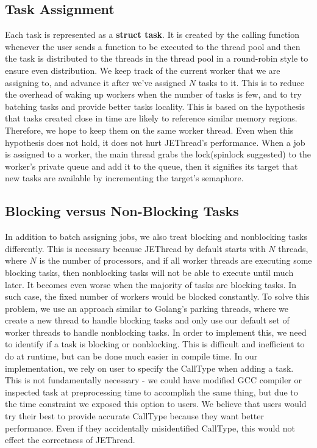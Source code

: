 \documentclass[journal, a4paper]{IEEEtran}
\begin{document}
\subsection{Task Assignment}
Each task is represented as a \textbf{struct task}. It is created by the calling function whenever the user sends a function to be executed to the thread pool and then the task is distributed to the threads in the thread pool in a round-robin style to ensure even distribution. We keep track of the current worker that we are assigning to, and advance it after we've assigned $N$ tasks to it. This is to reduce the overhead of waking up workers when the number of tasks is few, and to try batching tasks and provide better tasks locality. This is based on the hypothesis that tasks created close in time are likely to reference similar memory regions. Therefore, we hope to keep them on the same worker thread. Even when this hypothesis does not hold, it does not hurt JEThread's performance. When a job is assigned to a worker, the main thread grabs the lock(spinlock suggested) to the worker's private queue and add it to the queue, then it signifies its target that new tasks are available by incrementing the target's semaphore.

\subsection{Blocking versus Non-Blocking Tasks}
In addition to batch assigning jobs, we also treat blocking and nonblocking tasks differently. This is necessary because JEThread by default starts with $N$ threads, where $N$ is the number of processors, and if all worker threads are executing some blocking tasks, then nonblocking tasks will not be able to execute until much later. It becomes even worse when the majority of tasks are blocking tasks. In such case, the fixed number of workers would be blocked constantly. To solve this problem, we use an approach similar to Golang's parking threads, where we create a new thread to handle blocking tasks and only use our default set of worker threads to handle nonblocking tasks. In order to implement this, we need to identify if a task is blocking or nonblocking. This is difficult and inefficient to do at runtime, but can be done much easier in compile time. In our implementation, we rely on user to specify the CallType when adding a task. This is not fundamentally necessary - we could have modified GCC compiler or inspected task at preprocessing time to accomplish the same thing, but due to the time constraint we exposed this option to users. We believe that users would try their best to provide accurate CallType because they want better performance. Even if they accidentally misidentified CallType, this would not effect the correctness of JEThread.
\end{document}
